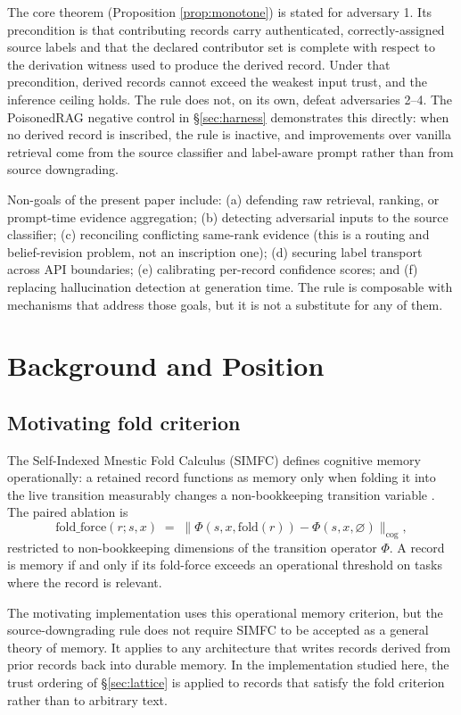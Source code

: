 \documentclass[11pt]{article}
\begin{document}
The core theorem (Proposition \ref{prop:monotone}) is stated for adversary 1. Its precondition is that contributing records carry authenticated, correctly-assigned source labels and that the declared contributor set is complete with respect to the derivation witness used to produce the derived record. Under that precondition, derived records cannot exceed the weakest input trust, and the inference ceiling holds. The rule does not, on its own, defeat adversaries 2--4. The PoisonedRAG negative control in \S\ref{sec:harness} demonstrates this directly: when no derived record is inscribed, the rule is inactive, and improvements over vanilla retrieval come from the source classifier and label-aware prompt rather than from source downgrading.

Non-goals of the present paper include: (a) defending raw retrieval, ranking, or prompt-time evidence aggregation; (b) detecting adversarial inputs to the source classifier; (c) reconciling conflicting same-rank evidence (this is a routing and belief-revision problem, not an inscription one); (d) securing label transport across API boundaries; (e) calibrating per-record confidence scores; and (f) replacing hallucination detection at generation time. The rule is composable with mechanisms that address those goals, but it is not a substitute for any of them.

\section{Background and Position}
\label{sec:background}

\subsection{Motivating fold criterion}

The Self-Indexed Mnestic Fold Calculus (SIMFC) defines cognitive memory operationally: a retained record functions as memory only when folding it into the live transition measurably changes a non-bookkeeping transition variable \cite{Carboni2025SIMFC}. The paired ablation is
\[
\text{fold\_force}(r;s,x) \;=\; \bigl\lVert \Phi(s,x,\text{fold}(r)) - \Phi(s,x,\varnothing) \bigr\rVert_{\text{cog}},
\]
restricted to non-bookkeeping dimensions of the transition operator $\Phi$. A record is memory if and only if its fold-force exceeds an operational threshold on tasks where the record is relevant.

The motivating implementation uses this operational memory criterion, but the source-downgrading rule does not require SIMFC to be accepted as a general theory of memory. It applies to any architecture that writes records derived from prior records back into durable memory. In the implementation studied here, the trust ordering of \S\ref{sec:lattice} is applied to records that satisfy the fold criterion rather than to arbitrary text.
\end{document}

